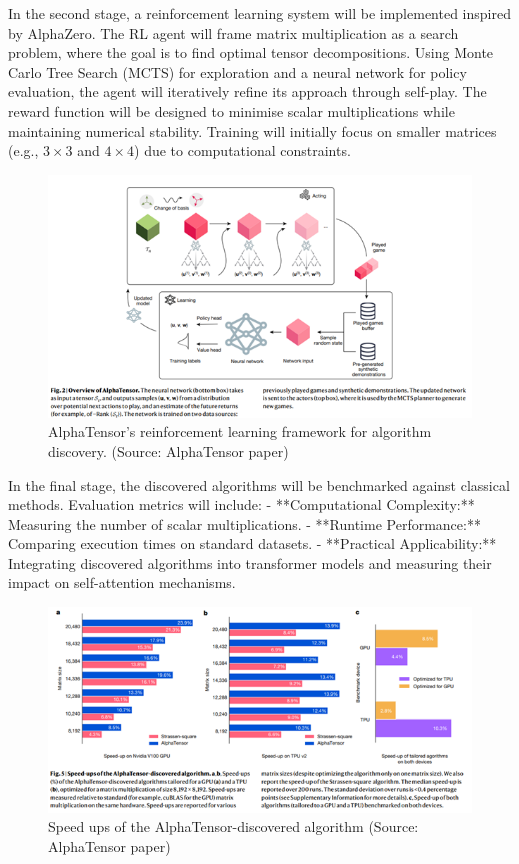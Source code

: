 \documentclass{article}
\begin{document}
In the second stage, a reinforcement learning system will be implemented inspired by AlphaZero. The RL agent will frame matrix multiplication as a search problem, where the goal is to find optimal tensor decompositions. Using Monte Carlo Tree Search (MCTS) for exploration and a neural network for policy evaluation, the agent will iteratively refine its approach through self-play. The reward function will be designed to minimise scalar multiplications while maintaining numerical stability. Training will initially focus on smaller matrices (e.g., \( 3 \times 3 \) and \( 4 \times 4 \)) due to computational constraints.  

\begin{figure}[H]
    \centering
    \includegraphics[width=0.6\linewidth]{Picture2.png}
    \caption{AlphaTensor's reinforcement learning framework for algorithm discovery. (Source: AlphaTensor paper)}
    \label{fig:alphatensor-framework}
\end{figure}

In the final stage, the discovered algorithms will be benchmarked against classical methods. Evaluation metrics will include:  
- **Computational Complexity:** Measuring the number of scalar multiplications.  
- **Runtime Performance:** Comparing execution times on standard datasets.  
- **Practical Applicability:** Integrating discovered algorithms into transformer models and measuring their impact on self-attention mechanisms.  
\begin{figure}[H]
    \centering
    \includegraphics[width=0.6\linewidth]{Picture3.png}
    \caption{Speed ups of the AlphaTensor-discovered algorithm (Source: AlphaTensor paper)}
    \label{fig:speedups-alphatensor}
\end{figure}
\end{document}
